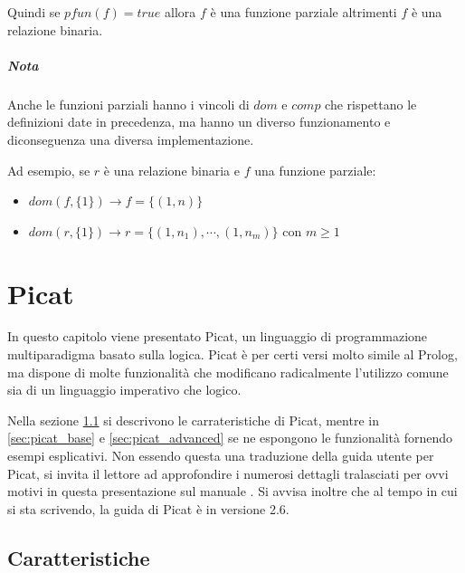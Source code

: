 \documentclass[12pt,a4paper,openright]{book} %
\begin{document}
Quindi se $pfun(f) = true$ allora $f$ è una funzione parziale altrimenti $f$ è una relazione binaria.

\paragraph{Nota}
Anche le funzioni parziali hanno i vincoli di $dom$ e $comp$ che rispettano le definizioni date in precedenza, ma hanno un diverso funzionamento e diconseguenza una diversa implementazione.

Ad esempio, se $r$ è una relazione binaria e $f$ una funzione parziale:
\begin{itemize}
\item $dom(f,\{1\}) \to f = \{(1,n)\}$
\item $dom(r,\{1\}) \to r = \{(1,n_1), \cdots, (1,n_m)\}$ con $m \geq 1$
\end{itemize}


\chapter{Picat}
\label{ch:picat}

\minitoc

In questo capitolo viene presentato Picat, un linguaggio di programmazione multiparadigma basato sulla logica. Picat è per certi versi molto simile al Prolog, ma dispone di molte funzionalità che modificano radicalmente l'utilizzo comune sia di un linguaggio imperativo che logico.

Nella sezione \ref{sec:picat_features} si descrivono le carrateristiche di Picat, mentre in \ref{sec:picat_base} e \ref{sec:picat_advanced} se ne espongono le funzionalità fornendo esempi esplicativi. Non essendo questa una traduzione della guida utente per Picat, si invita il lettore ad approfondire i numerosi dettagli tralasciati per ovvi motivi in questa presentazione sul manuale \cite{PicatGuide}. Si avvisa inoltre che al tempo in cui si sta scrivendo, la guida di Picat è in versione 2.6.

\section{Caratteristiche}
\label{sec:picat_features}
\end{document}
